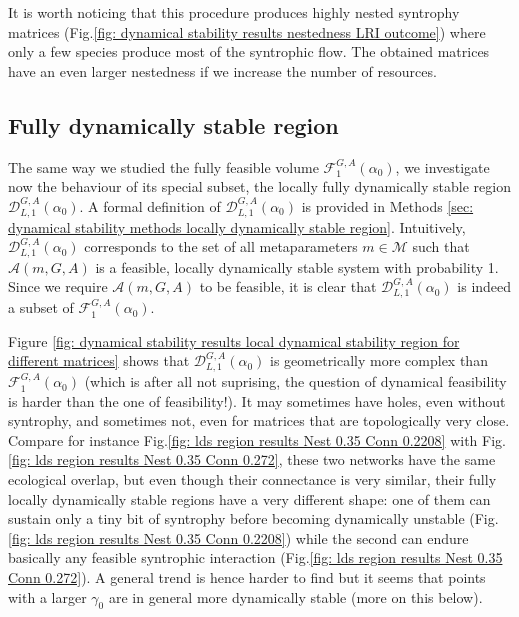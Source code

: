 \documentclass[12pt, titlepage]{report}
\begin{document}
It is worth noticing that this procedure produces highly nested syntrophy matrices (Fig.\ref{fig: dynamical stability results nestedness LRI outcome}) where only a few species produce most of the syntrophic flow. The obtained matrices have an even larger nestedness if we increase the number of resources.



\subsection{Fully dynamically stable region}
The same way we studied the fully feasible volume $\mathcal{F}_{1}^{G,A}(\alpha_0)$, we investigate now the behaviour of its special subset, the locally fully dynamically stable region $\mathcal{D}^{G,A}_{L,1}\left(\alpha_0\right)$. A formal definition of $\mathcal{D}^{G,A}_{L,1}\left(\alpha_0\right)$ is provided in Methods \ref{sec: dynamical stability methods locally dynamically stable region}. Intuitively, $\mathcal{D}^{G,A}_{L,1}\left(\alpha_0\right)$ corresponds to the set of all metaparameters $m \in \mathcal{M}$ such that $\mathcal{A}(m, G, A)$ is a feasible, locally dynamically stable system with probability 1. Since we require $\mathcal{A}(m, G, A)$ to be feasible, it is clear that $\mathcal{D}^{G,A}_{L,1}\left(\alpha_0\right)$ is indeed a subset of $\mathcal{F}^{G,A}_1\left(\alpha_0\right)$.

Figure \ref{fig: dynamical stability results local dynamical stability region for different matrices} shows
that $\mathcal{D}_{L,1}^{G,A}\left(\alpha_0\right)$ is geometrically more complex than $\mathcal{F}_{1}^{G,A}\left(\alpha_0\right)$ (which is after all not suprising, the question of dynamical feasibility is harder than the one of feasibility!). It may sometimes have holes, even without syntrophy, and sometimes not, even for matrices that are topologically very close. Compare for instance Fig.\ref{fig: lds region results Nest 0.35 Conn 0.2208} with Fig.\ref{fig: lds region results Nest 0.35 Conn 0.272}, these two networks have the same ecological overlap, but even though their connectance is very similar, their fully locally dynamically stable regions have a very different shape: one of them can sustain only a tiny bit of syntrophy before becoming dynamically unstable (Fig.\ref{fig: lds region results Nest 0.35 Conn 0.2208}) while the second can endure basically any feasible syntrophic interaction (Fig.\ref{fig: lds region results Nest 0.35 Conn 0.272}). A general trend is hence harder to find but it seems that points with a larger $\gamma_0$ are in general more dynamically stable (more on this below).
\end{document}
